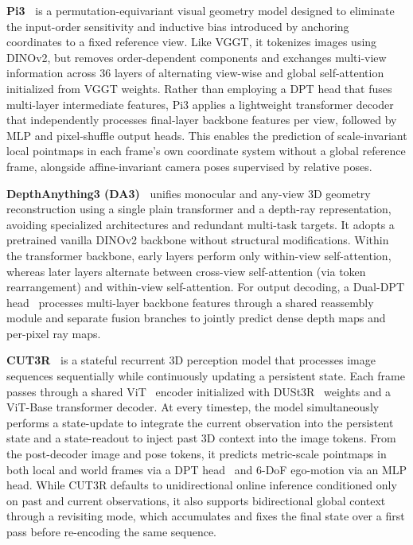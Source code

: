 \textbf{Pi3~\cite{wang2026permutation}} is a permutation-equivariant visual geometry model designed to eliminate the input-order sensitivity and inductive bias introduced by anchoring coordinates to a fixed reference view. Like VGGT, it tokenizes images using DINOv2, but removes order-dependent components and exchanges multi-view information across 36 layers of alternating view-wise and global self-attention initialized from VGGT weights. Rather than employing a DPT head that fuses multi-layer intermediate features, Pi3 applies a lightweight transformer decoder that independently processes final-layer backbone features per view, followed by MLP and pixel-shuffle output heads. This enables the prediction of scale-invariant local pointmaps in each frame's own coordinate system without a global reference frame, alongside affine-invariant camera poses supervised by relative poses.

\textbf{DepthAnything3 (DA3)~\cite{lin2025depth}} unifies monocular and any-view 3D geometry reconstruction using a single plain transformer and a depth-ray representation, avoiding specialized architectures and redundant multi-task targets. It adopts a pretrained vanilla DINOv2 backbone without structural modifications. Within the transformer backbone, early layers perform only within-view self-attention, whereas later layers alternate between cross-view self-attention (via token rearrangement) and within-view self-attention. For output decoding, a Dual-DPT head~\cite{ranftl2021vision} processes multi-layer backbone features through a shared reassembly module and separate fusion branches to jointly predict dense depth maps and per-pixel ray maps.

\textbf{CUT3R~\cite{wang2025continuous}} is a stateful recurrent 3D perception model that processes image sequences sequentially while continuously updating a persistent state. Each frame passes through a shared ViT~\cite{dosovitskiy2021an} encoder initialized with DUSt3R~\cite{wang2024dust3r} weights and a ViT-Base transformer decoder. At every timestep, the model simultaneously performs a state-update to integrate the current observation into the persistent state and a state-readout to inject past 3D context into the image tokens. From the post-decoder image and pose tokens, it predicts metric-scale pointmaps in both local and world frames via a DPT head~\cite{ranftl2021vision} and 6-DoF ego-motion via an MLP head. While CUT3R defaults to unidirectional online inference conditioned only on past and current observations, it also supports bidirectional global context through a revisiting mode, which accumulates and fixes the final state over a first pass before re-encoding the same sequence.

